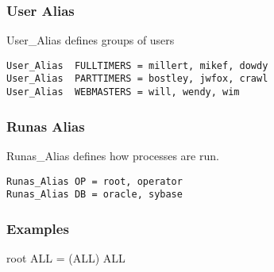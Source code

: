 \documentclass[12pt,handout,aspectratio=169]{beamer}
\begin{document}
\begin{frame}[fragile]
  \frametitle{User Alias}
User\_Alias defines groups of users
\begin{verbatim}
User_Alias	FULLTIMERS = millert, mikef, dowdy
User_Alias	PARTTIMERS = bostley, jwfox, crawl
User_Alias	WEBMASTERS = will, wendy, wim
\end{verbatim}
\end{frame}
\begin{frame}[fragile]
  \frametitle{Runas Alias}
  Runas\_Alias defines how processes are run.
\begin{verbatim}
Runas_Alias	OP = root, operator
Runas_Alias	DB = oracle, sybase
\end{verbatim}
\end{frame}
\begin{frame}[fragile]
  \frametitle{Examples}
\begin{semiverbatim}
root		ALL = (ALL) ALL
\end{semiverbatim}
\end{frame}
\end{document}
